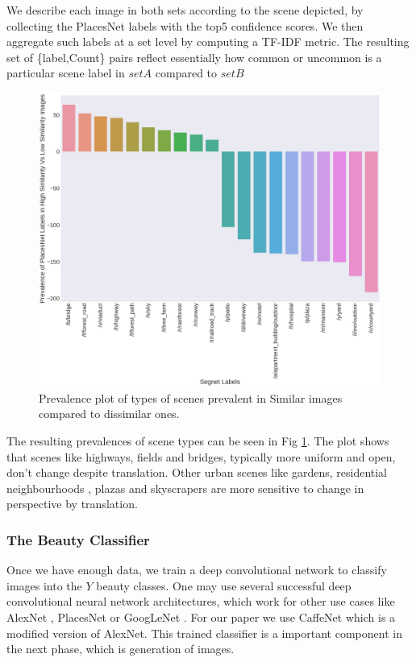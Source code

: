 We describe each image in both sets according to the scene depicted, by collecting the PlacesNet \cite{zhou2014learning} labels with the top5 confidence scores. We then aggregate such labels at a set level by computing a TF-IDF metric. The resulting set of \{label,Count\} pairs reflect essentially how common or uncommon is a particular scene label in $setA$ compared to $setB$ 

\begin{figure}[ht]
	\centering
	\includegraphics[width=\columnwidth]{Plot/SimilarityPlacesPrevalence.png}
	\caption{Prevalence plot of types of scenes prevalent in Similar images compared to dissimilar ones.}
	\label{fig:augmentationSimilarity}
\end{figure}

The resulting prevalences of scene types can be seen in Fig \ref{fig:augmentationSimilarity}. The plot shows that scenes like highways, fields and bridges, typically more uniform and open, 
don't change despite translation. Other urban scenes like gardens, residential neighbourhoods , plazas and skyscrapers  are more sensitive to change in perspective by translation. 


\subsubsection{The Beauty Classifier}
\label{sec:classifier}
Once we have enough data, we train a deep convolutional network %
to classify images into the $Y$ beauty classes. One may use several successful deep convolutional neural network architectures, which work for other use cases like AlexNet \cite{krizhevsky2012imagenet} , PlacesNet \cite{zhou2014learning} or GoogLeNet \cite{szegedy2015going}.  For our paper we use CaffeNet which is a modified version of AlexNet. This trained classifier is a important component in the next phase, which is generation of images. 

